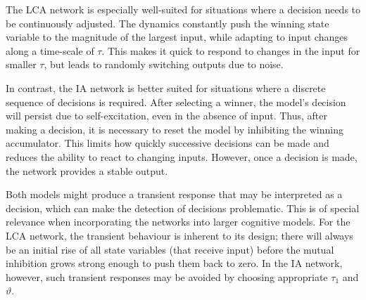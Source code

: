 \documentclass[10pt,letterpaper]{article}
\begin{document}
The LCA network is especially well-suited for situations where a decision needs to be continuously adjusted.
The dynamics constantly push the winning state variable to the magnitude of the largest input, while adapting to input changes along a time-scale of $\tau$.
This makes it quick to respond to changes in the input for smaller $\tau$, but leads to randomly switching outputs due to noise.

In contrast, the IA network is better suited for situations where a discrete sequence of decisions is required.
After selecting a winner, the model's decision will persist due to self-excitation, even in the absence of input.
Thus, after making a decision, it is necessary to reset the model by inhibiting the winning accumulator.
This limits how quickly successive decisions can be made and reduces the ability to react to changing inputs.
However, once a decision is made, the network provides a stable output.

Both models might produce a transient response that may be interpreted as a decision, which can make the detection of decisions problematic.
This is of special relevance when incorporating the networks into larger cognitive models.
For the LCA network, the transient behaviour is inherent to its design; there will always be an initial rise of all state variables (that receive input) before the mutual inhibition grows strong enough to push them back to zero.
In the IA network, however, such transient responses may be avoided by choosing appropriate $\tau_1$ and $\vartheta$.

\end{document}
